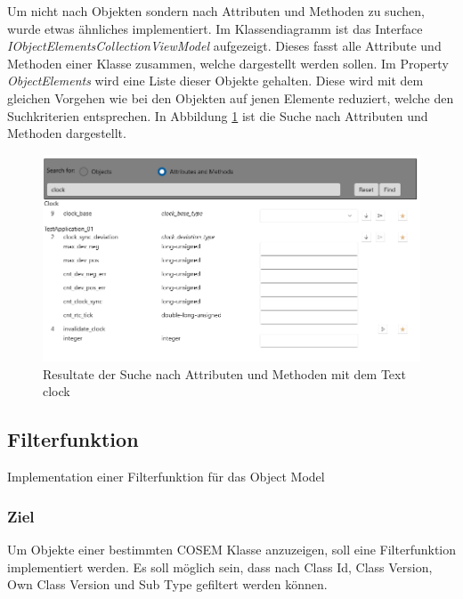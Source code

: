 Um nicht nach Objekten sondern nach Attributen und Methoden zu suchen, wurde etwas ähnliches implementiert.
Im Klassendiagramm ist das Interface \textit{IObjectElementsCollectionViewModel} aufgezeigt.
Dieses fasst alle Attribute und Methoden einer Klasse zusammen, welche dargestellt werden sollen.
Im Property \textit{ObjectElements} wird eine Liste dieser Objekte gehalten.
Diese wird mit dem gleichen Vorgehen wie bei den Objekten auf jenen Elemente reduziert, welche den Suchkriterien entsprechen.
In Abbildung \ref{fig:searchforClock} ist die Suche nach Attributen und Methoden dargestellt.


\begin{figure}
   \centering
   \includegraphics[width=1.0\textwidth]{gfx/searchforclick.png}
   \caption{
      Resultate der Suche nach Attributen und Methoden mit dem Text \dq clock\dq
      }
      \label{fig:searchforClock}
\end{figure}




\subsection{Filterfunktion}
\dq Implementation einer Filterfunktion für das Object Model\dq
\subsubsection{Ziel}
Um Objekte einer bestimmten \ac{COSEM} Klasse anzuzeigen, soll eine Filterfunktion implementiert werden.
Es soll möglich sein, dass nach Class Id, Class Version, Own Class Version und Sub Type gefiltert werden können.
